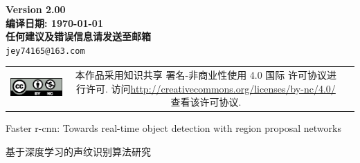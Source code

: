 \documentclass{qbook}
\begin{document}
\pagestyle{empty}
\begin{center}
	\Large{\sffamily\bfseries\heiti Version 2.00} \\ \vspace{2em}
	\Large{\sffamily\bfseries\heiti 编译日期: \today} \\ \vspace{1em}
	\Large{\sffamily\bfseries\heiti 任何建议及错误信息请发送至邮箱} \\
	\texttt{jey74165@163.com}
\end{center}
\vfill
\vspace{30em}
\begin{tabular*}{\textwidth}{ccc}
	\includegraphics{figure/by-nc.eps}
	& \begin{minipage}[b]{0.6\textwidth}
		\small\sffamily
		本作品采用知识共享 署名-非商业性使用 4.0 国际 许可协议进行许可. 访问\url{http://creativecommons.org/licenses/by-nc/4.0/  }查看该许可协议.
	\end{minipage}
\end{tabular*}
\thispagestyle{empty}
\frontmatter  %
\pagestyle{empty}
%
\pagestyle{empty}
\tableofcontents
\cleardoublepage
%
\mainmatter	  %
\pagestyle{fancy}
\setcounter{page}{0}





%
%
%
%
%
\backmatter	
\printbibliography[heading=bibintoc]
Faster r-cnn: Towards real-time object detection with region proposal networks \cite{ren2015faster}

基于深度学习的声纹识别算法研究 \cite{123a}
\makeatletter
\makeatother
\end{document}
